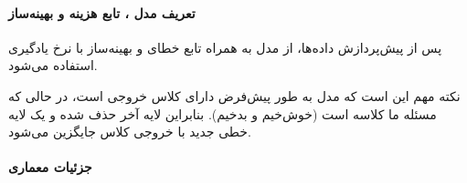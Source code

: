 \documentclass{article}
\begin{document}
\paragraph{تعریف مدل ، تابع هزینه و بهینه‌ساز}

پس از پیش‌پردازش داده‌ها، از مدل  به همراه تابع خطای  و بهینه‌ساز  با نرخ یادگیری  استفاده می‌شود.

نکته مهم این است که مدل  به طور پیش‌فرض دارای  کلاس خروجی است، در حالی که مسئله ما  کلاسه است (خوش‌خیم و بدخیم). بنابراین لایه آخر حذف شده و یک لایه خطی جدید با خروجی  کلاس جایگزین می‌شود.

\paragraph{جزئیات معماری }
\end{document}

